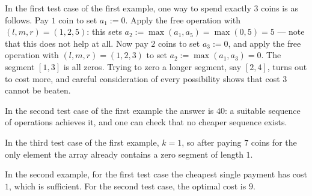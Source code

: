 In the first test case of the first example, one way to spend exactly $3$ coins is as follows. Pay $1$ coin to set $a_1 := 0$. Apply the free operation with $(l, m, r) = (1, 2, 5)$: this sets $a_2 := \max(a_1, a_5) = \max(0, 5) = 5$ — note that this does not help at all. Now pay $2$ coins to set $a_3 := 0$, and apply the free operation with $(l, m, r) = (1, 2, 3)$ to set $a_2 := \max(a_1, a_3) = 0$. The segment $[1, 3]$ is all zeros. Trying to zero a longer segment, say $[2, 4]$, turns out to cost more, and careful consideration of every possibility shows that cost $3$ cannot be beaten.

In the second test case of the first example the answer is $40$: a suitable sequence of operations achieves it, and one can check that no cheaper sequence exists.

In the third test case of the first example, $k = 1$, so after paying $7$ coins for the only element the array already contains a zero segment of length $1$.

In the second example, for the first test case the cheapest single payment has cost $1$, which is sufficient. For the second test case, the optimal cost is $9$.
